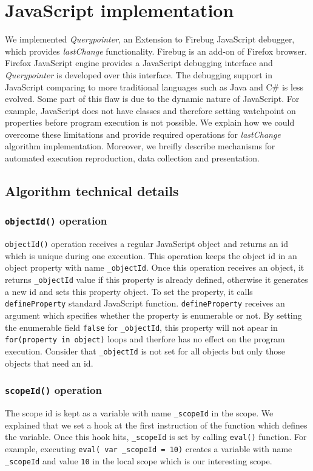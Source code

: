 \documentclass[preprint]{sigplanconf}
\begin{document}
\section{JavaScript implementation}
We implemented \textit{Querypointer}, an Extension to Firebug
JavaScript debugger, which provides \textit{lastChange}
functionality. Firebug is an add-on of Firefox browser. Firefox
JavaScript engine provides a JavaScript debugging interface and
\textit{Querypointer} is developed over this interface. The debugging
support in JavaScript comparing to more traditional languages such as
Java and C\# is less evolved. Some part of this flaw is due to the
dynamic nature of JavaScript. For example, JavaScript does not have
classes and therefore setting watchpoint on properties before program
execution is not possible. We explain how we could overcome these
limitations and provide required operations for \textit{lastChange}
algorithm implementation. Moreover, we breifly describe mechanisms for
automated execution reproduction, data collection and presentation.

\subsection{Algorithm technical details}
\subsubsection{\texttt{objectId()} operation}
\texttt{objectId()} operation receives a regular JavaScript object and
returns an id which is unique during one execution. This operation
keeps the object id in an object property with name
\texttt{\_objectId}. Once this operation receives an object, it
returns \texttt{\_objectId} value if this property is already defined,
otherwise it generates a new id and sets this property object. To set
the property, it calls \texttt{defineProperty} standard JavaScript
function. \texttt{defineProperty} receives an argument which specifies
whether the property is enumerable or not. By setting the enumerable
field \texttt{false} for \texttt{\_objectId}, this property will not
apear in \texttt{for(property in object)} loops and therfore has no
effect on the program execution. Consider that \texttt{\_objectId} is
not set for all objects but only those objects that need an id.

\subsubsection{\texttt{scopeId()} operation}
The scope id is kept as a variable with name \texttt{\_scopeId} in the
scope. We explained that we set a hook at the first instruction of the
function which defines the variable. Once this hook hits,
\texttt{\_scopeId} is set by calling \texttt{eval()} function. For
example, executing \texttt{eval( var \_scopeId = 10)} creates a
variable with name \texttt{\_scopeId} and value \texttt{10} in the
local scope which is our interesting scope.
\end{document}

